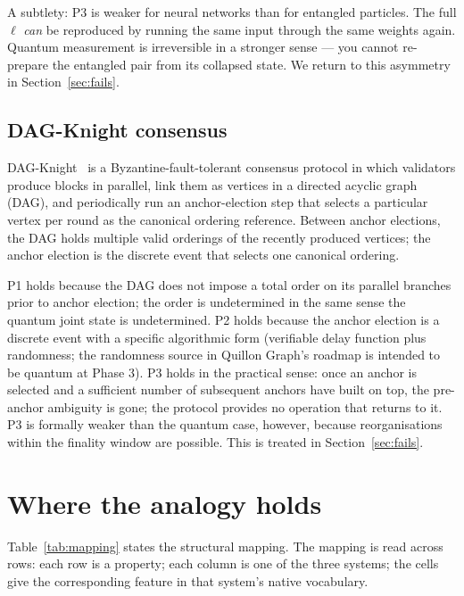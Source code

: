 \documentclass[11pt,a4paper]{article}
\begin{document}
A subtlety: P3 is weaker for neural networks than for entangled particles.
The full $\ell$ \emph{can} be reproduced by running the same input
through the same weights again. Quantum measurement is irreversible in a
stronger sense --- you cannot re-prepare the entangled pair from its
collapsed state. We return to this asymmetry in Section~\ref{sec:fails}.

\subsection{DAG-Knight consensus}

DAG-Knight~\cite{keidar2022dag} is a Byzantine-fault-tolerant consensus
protocol in which validators produce blocks in parallel, link them as
vertices in a directed acyclic graph (DAG), and periodically run an
anchor-election step that selects a particular vertex per round as the
canonical ordering reference. Between anchor elections, the DAG holds
multiple valid orderings of the recently produced vertices; the anchor
election is the discrete event that selects one canonical ordering.

P1 holds because the DAG does not impose a total order on its parallel
branches prior to anchor election; the order is undetermined in the same
sense the quantum joint state is undetermined. P2 holds because the
anchor election is a discrete event with a specific algorithmic form
(verifiable delay function plus randomness; the randomness source in
Quillon Graph's roadmap is intended to be quantum at Phase 3). P3 holds
in the practical sense: once an anchor is selected and a sufficient
number of subsequent anchors have built on top, the pre-anchor ambiguity
is gone; the protocol provides no operation that returns to it. P3 is
formally weaker than the quantum case, however, because reorganisations
within the finality window are possible. This is treated in
Section~\ref{sec:fails}.

\section{Where the analogy holds}

Table~\ref{tab:mapping} states the structural mapping. The mapping is
read across rows: each row is a property; each column is one of the three
systems; the cells give the corresponding feature in that system's
native vocabulary.
\end{document}
